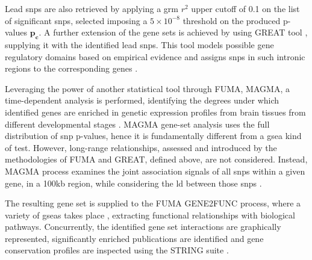 Lead \acp{snp} are also retrieved by applying a \ac{grm} $r^2$ upper cutoff of 0.1 on the list of significant \acp{snp}, selected imposing a $5\times 10 ^ {-8}$ threshold on the produced p-values $\mathbf{p_c}$. A further extension of the gene sets is achieved by using GREAT tool \cite{McLean2010}, supplying it with the identified lead \acp{snp}. This tool models possible gene regulatory domains based on empirical evidence and assigns \acp{snp} in such intronic regions to the corresponding genes \cite{McLean2010}.

Leveraging the power of another statistical tool through FUMA, MAGMA, a time-dependent analysis is performed, identifying the degrees under which identified genes are enriched in genetic expression profiles from brain tissues from different developmental stages \cite{DeLeeuw2015}. MAGMA gene-set analysis uses the full distribution of \ac{snp} p-values, hence it is fundamentally different from a \ac{gsea} kind of test. However, long-range relationships, assessed and introduced by the methodologies of FUMA and GREAT, defined above, are not considered. Instead, MAGMA process examines the joint association signals of all \acp{snp} within a given gene, in a 100kb region, while considering the \ac{ld} between those \acp{snp} \cite{DeLeeuw2015,Sha2021}.

The resulting gene set is supplied to the FUMA GENE2FUNC process, where a variety of \acp{gsea} takes place \cite{Watanabe2017}, extracting functional relationships with biological pathways. Concurrently, the identified gene set interactions are graphically represented, significantly enriched publications are identified and gene conservation profiles are inspected using the STRING suite \cite{Szklarczyk2021}.

	


